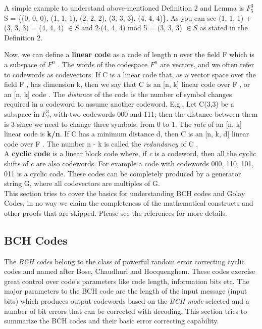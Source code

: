 A simple example to understand above-mentioned Definition 2 and Lemma is $F_5^3$\\
S = \{(0, 0, 0), (1, 1, 1), (2, 2, 2), (3, 3, 3), (4, 4, 4)\}.
As you can see (1, 1, 1) + (3, 3, 3) = (4, 4, 4) $\in S$ and 2$\cdot$(4, 4, 4) mod 5 = (3, 3, 3) $\in S$ as stated in the Definition 2.

Now, we can define a \textbf{linear code} as a code of length n over the field F which is a subspace of $F^n$ . The words of the codespace $F^n$ are vectors, and we often refer to codewords as codevectors.
If C is a linear code that, as a vector space over the field F , has dimension k,
then we say that C is an [n, k] linear code over F , or an [n, k] code \cite{linear}. The \emph{distance} of the code is the number of symbol changes required in a codeword to assume another codeword. E.g., Let C(3,3) be a subspace in $F_2^3$, with two codewords 000 and 111; then the distance between them is 3 since we need to change three symbols, from 0 to 1.
The \emph{rate} of an [n, k] linear code is \textbf{k/n}. If C has a minimum distance d, then C is an [n, k, d] linear code over F .
The number n - k is called the \emph{redundancy} of C \cite{linear}.\\

A \textbf{cyclic code} is a linear block code where, if \emph{c} is a codeword, then all the cyclic shifts of $c$ are also codewords.
For example a code with codewords {000, 110, 101, 011} is a cyclic code.
These codes can be completely produced by a generator string G, where all codevectors are multiples of G.\\

This section tries to cover the basics for understanding BCH codes and Golay Codes, in no way we claim the completeness of the mathematical constructs and other proofs that are skipped. Please see the references for more details.\\

\subsection{BCH Codes}
\label{bch_section}
The \emph{BCH codes} belong to the class of powerful random error correcting cyclic codes and named after Bose, Chaudhuri and Hocquenghem. These codes exercise great control over code's parameters like code length, information bits etc. The major parameters to the BCH code are the length of the input message (input bits) which produces output codewords based on the \emph{BCH mode} selected and a number of bit errors that can be corrected with decoding. This section tries to summarize the BCH codes and
their basic error correcting capability.\\

